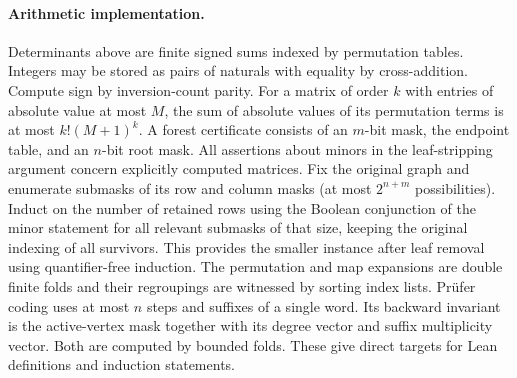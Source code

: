 \paragraph{Arithmetic implementation.}
Determinants above are finite signed sums indexed by permutation tables. Integers may be stored as pairs of naturals with equality by cross-addition. Compute sign by inversion-count parity. For a matrix of order $k$ with entries of absolute value at most $M$, the sum of absolute values of its permutation terms is at most $k!(M+1)^k$. A forest certificate consists of an $m$-bit mask, the endpoint table, and an $n$-bit root mask. All assertions about minors in the leaf-stripping argument concern explicitly computed matrices. Fix the original graph and enumerate submasks of its row and column masks (at most $2^{n+m}$ possibilities). Induct on the number of retained rows using the Boolean conjunction of the minor statement for all relevant submasks of that size, keeping the original indexing of all survivors. This provides the smaller instance after leaf removal using quantifier-free induction. The permutation and map expansions are double finite folds and their regroupings are witnessed by sorting index lists. Pr\"ufer coding uses at most $n$ steps and suffixes of a single word. Its backward invariant is the active-vertex mask together with its degree vector and suffix multiplicity vector. Both are computed by bounded folds. These give direct targets for Lean definitions and induction statements.
